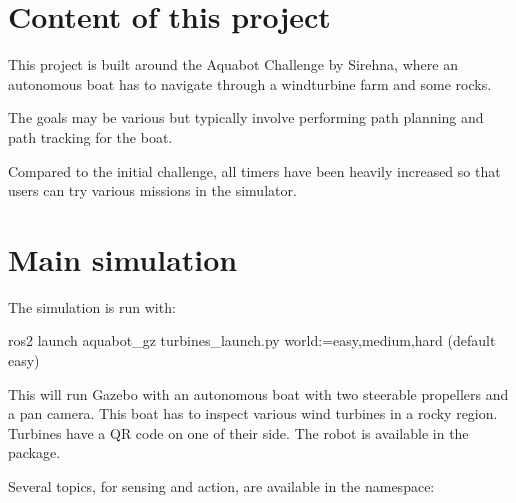 \documentclass{ecnreport}
\begin{document}
  
  
  \section{Content of this project}

  This project is built around the Aquabot Challenge by Sirehna, where an autonomous boat has to navigate through a windturbine farm and some rocks.

  The goals may be various but typically involve performing path planning and path tracking for the boat.

Compared to the initial challenge, all timers have been heavily increased so that users can try various missions in the simulator.

  \section{Main simulation}

  The simulation is run with:
  \begin{bashcode}
   ros2 launch aquabot_gz turbines_launch.py world:={easy,medium,hard} (default easy)
  \end{bashcode}

  This will run Gazebo with an autonomous boat with two steerable propellers and a pan camera. This boat has to inspect various wind turbines in a
rocky region. Turbines have a QR code on one of their side. The robot is available in the  package.

Several topics, for sensing and action, are available in the  namespace:
\end{document}
